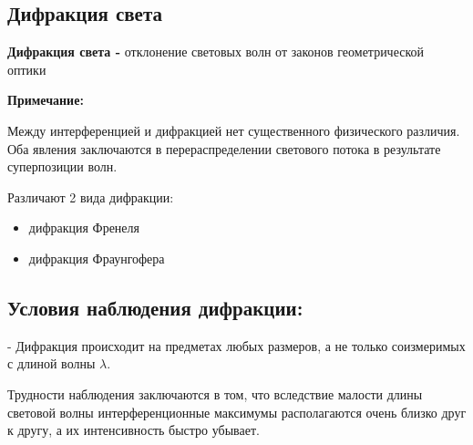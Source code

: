 \documentclass[12pt]{report}
\begin{document}
\subsection{Дифракция света}
\textbf{Дифракция света -} отклонение световых волн от законов геометрической оптики\par
\textbf{Примечание:}\par
Между интерференцией и дифракцией нет существенного
физического различия. Оба явления заключаются в
перераспределении светового потока в результате суперпозиции
волн.\par
Различают 2 вида дифракции:\par
\begin{itemize}
    \item дифракция Френеля\par
    \item дифракция Фраунгофера\par
\end{itemize}
\subsection{Условия наблюдения дифракции:}
- Дифракция происходит на предметах любых размеров, а не только соизмеримых с длиной волны $\lambda$.

Трудности наблюдения заключаются в том, что вследствие малости длины световой волны интерференционные максимумы располагаются очень близко друг к другу, а их интенсивность быстро убывает.
\end{document}
